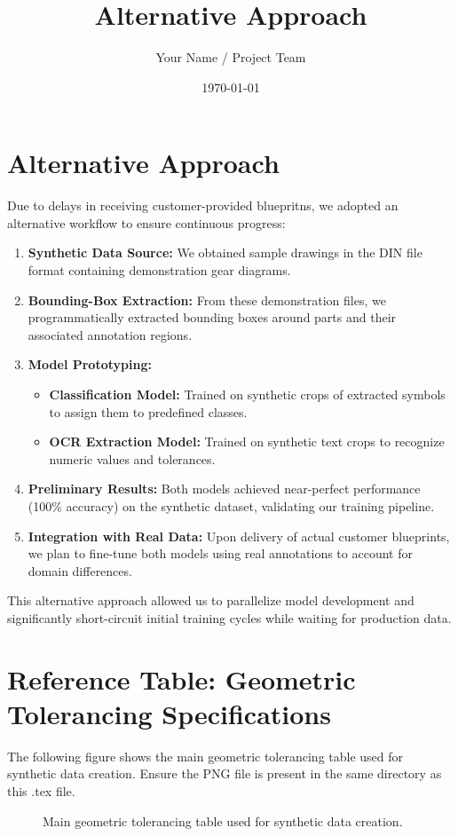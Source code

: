 \documentclass[a4paper,12pt]{article}
\title{Alternative Approach}
\author{Your Name / Project Team}
\date{\today}
\begin{document}
\maketitle

\section*{Alternative Approach}
Due to delays in receiving customer-provided bluepritns, we adopted an alternative workflow to ensure continuous progress:

\begin{enumerate}
  \item \textbf{Synthetic Data Source:} We obtained sample drawings in the DIN file format containing demonstration gear diagrams.
  \item \textbf{Bounding-Box Extraction:} From these demonstration files, we programmatically extracted bounding boxes around parts and their associated annotation regions.
  \item \textbf{Model Prototyping:}
    \begin{itemize}
      \item \textbf{Classification Model:} Trained on synthetic crops of extracted symbols to assign them to predefined classes.
      \item \textbf{OCR Extraction Model:} Trained on synthetic text crops to recognize numeric values and tolerances.
    \end{itemize}
  \item \textbf{Preliminary Results:} Both models achieved near-perfect performance (100\% accuracy) on the synthetic dataset, validating our training pipeline.
  \item \textbf{Integration with Real Data:} Upon delivery of actual customer blueprints, we plan to fine-tune both models using real annotations to account for domain differences.
\end{enumerate}

This alternative approach allowed us to parallelize model development and significantly short-circuit initial training cycles while waiting for production data.

\section*{Reference Table: Geometric Tolerancing Specifications}
The following figure shows the main geometric tolerancing table used for synthetic data creation. Ensure the PNG file is present in the same directory as this .tex file.

\begin{figure}[h!]
  \centering
  \caption{Main geometric tolerancing table used for synthetic data creation.}
  \label{fig:geom_tol}
\end{figure}
\end{document}
